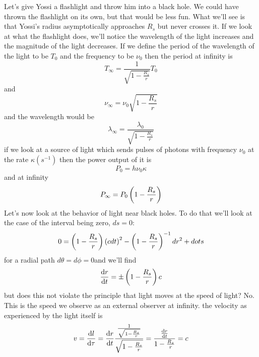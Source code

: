 Let's give Yossi a flashlight and throw him into a black hole. We could have thrown the flashlight on its own, but that would be less fun. What we'll see is that Yossi's radius asymptotically approaches \(R_s\) but never crosses it. If we look at what the flashlight does, we'll notice the wavelength of the light increases and the magnitude of the light decreases. If we define the period of the wavelength of the light to be \(T_0\) and the frequency to be \(\nu_0\) then the period at infinity is
\begin{equation}
    T_\infty = \frac{1}{\sqrt{1-\frac{R_s}{r}}}T_0
\end{equation}
and
\begin{equation}
    \nu_\infty = \nu_0\sqrt{1-\frac{R_s}{r}}
\end{equation}
and the wavelength would be
\begin{equation}
    \lambda_\infty = \frac{\lambda_0}{\sqrt{1-\frac{R_s}{r}}}
\end{equation}
if we look at a source of light which sends pulses of photons with frequency \(\nu_0\) at the rate \(\kappa (s^{-1})\) then the power output of it is
\begin{equation}
    P_0 = h\nu_0\kappa
\end{equation}
and at infinity
\begin{equation}
    P_\infty = P_0\left(1-\frac{R_s}{r}\right)
\end{equation}
Let's now look at the behavior of light near black holes. To do that we'll look at the case of the interval being zero, \(ds = 0\):
\begin{equation}
    0 = \left(1-\frac{R_s}{r}\right)\left(cdt\right)^2 - \left(1-\frac{R_s}{r}\right)^{-1}dr^2+dots
\end{equation}
for a radial path \(d\theta = d\phi = 0\)and we'll find
\begin{equation}
    \diff{r}{t} = \pm \ins{1-\frac{R_s}{r}}c
\end{equation}
but does this not violate the principle that light moves at the speed of light? No. This is the speed we observe as an external observer at infinity. the velocity as experienced by the light itself is
\begin{equation}
    v = \diff{l}{\tau} = \diff{r}{t}\frac{\frac{1}{\sqrt{1-\frac{R_s}{r}}}}{\sqrt{1-\frac{R_s}{r}}} = \frac{\diff{r}{t}}{1-\frac{R_s}{r}} = c
\end{equation}
